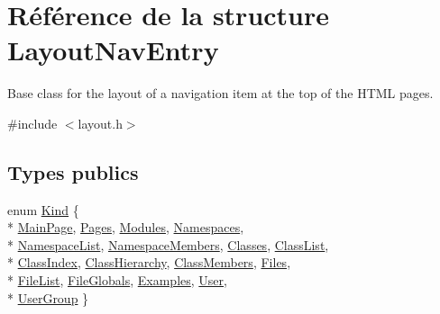 \hypertarget{struct_layout_nav_entry}{}\section{Référence de la structure Layout\+Nav\+Entry}
\label{struct_layout_nav_entry}


Base class for the layout of a navigation item at the top of the H\+T\+M\+L pages.  




{\ttfamily \#include $<$layout.\+h$>$}

\subsection*{Types publics}
\begin{DoxyCompactItemize}
\item 
enum \hyperlink{struct_layout_nav_entry_aef36305dd829f7cde87ca203ae647c7c}{Kind} \{ \\*
\hyperlink{struct_layout_nav_entry_aef36305dd829f7cde87ca203ae647c7ca53e72568b7ada7fcd9e75c1bb5052d54}{Main\+Page}, 
\hyperlink{struct_layout_nav_entry_aef36305dd829f7cde87ca203ae647c7cacab077172e44567b5b1e7890cde1d0b4}{Pages}, 
\hyperlink{struct_layout_nav_entry_aef36305dd829f7cde87ca203ae647c7ca7ec847f42f630b812ad30b4b12430270}{Modules}, 
\hyperlink{struct_layout_nav_entry_aef36305dd829f7cde87ca203ae647c7caf7440b574ac1a75aea7befa7e1352397}{Namespaces}, 
\\*
\hyperlink{struct_layout_nav_entry_aef36305dd829f7cde87ca203ae647c7caa6f9e295b343cd7e5946dd4748ac376a}{Namespace\+List}, 
\hyperlink{struct_layout_nav_entry_aef36305dd829f7cde87ca203ae647c7ca2df3b63f6d451886e365304c100ff5bc}{Namespace\+Members}, 
\hyperlink{struct_layout_nav_entry_aef36305dd829f7cde87ca203ae647c7caf38912c22195a9dc01304137f0a34a8b}{Classes}, 
\hyperlink{struct_layout_nav_entry_aef36305dd829f7cde87ca203ae647c7ca199cdf6052f9ae748faef03b07990b48}{Class\+List}, 
\\*
\hyperlink{struct_layout_nav_entry_aef36305dd829f7cde87ca203ae647c7cae0fbb0d44ffcf8d8831afa4af6fc478c}{Class\+Index}, 
\hyperlink{struct_layout_nav_entry_aef36305dd829f7cde87ca203ae647c7ca8b7c480240f9d989b78901ced52c4904}{Class\+Hierarchy}, 
\hyperlink{struct_layout_nav_entry_aef36305dd829f7cde87ca203ae647c7caae821e8f40e4e3fde63033c09e16056c}{Class\+Members}, 
\hyperlink{struct_layout_nav_entry_aef36305dd829f7cde87ca203ae647c7cac9d7b0d03cbbe31ba776a25c88ea2efe}{Files}, 
\\*
\hyperlink{struct_layout_nav_entry_aef36305dd829f7cde87ca203ae647c7ca24f73f0ccb94bb9f8b1f0ef2a7c10009}{File\+List}, 
\hyperlink{struct_layout_nav_entry_aef36305dd829f7cde87ca203ae647c7ca0120a75799ad6e2b2eaff7b010f384c6}{File\+Globals}, 
\hyperlink{struct_layout_nav_entry_aef36305dd829f7cde87ca203ae647c7ca8dd2b8dbead139cad91e6d0ac3334350}{Examples}, 
\hyperlink{struct_layout_nav_entry_aef36305dd829f7cde87ca203ae647c7ca8c9dd04b1066a22886eeb09e825e38e4}{User}, 
\\*
\hyperlink{struct_layout_nav_entry_aef36305dd829f7cde87ca203ae647c7ca4a4df83d473483c0b7761cf169df3f30}{User\+Group}
 \}
\end{DoxyCompactItemize}
